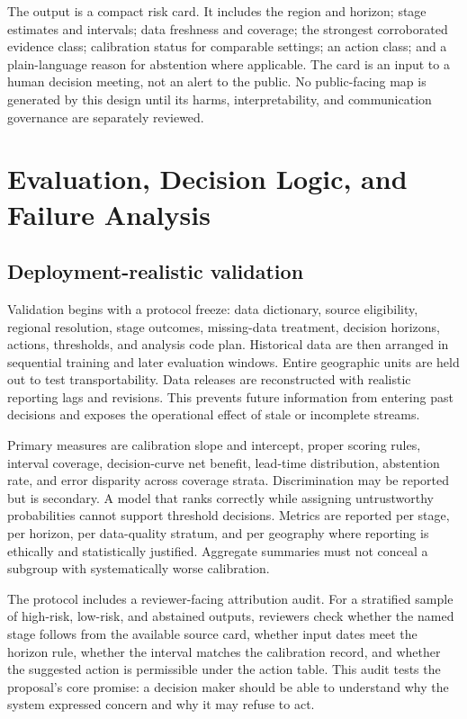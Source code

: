\documentclass[conference]{IEEEtran}
\begin{document}
The output is a compact risk card. It includes the region and horizon; stage estimates and intervals; data freshness and coverage; the strongest corroborated evidence class; calibration status for comparable settings; an action class; and a plain-language reason for abstention where applicable. The card is an input to a human decision meeting, not an alert to the public. No public-facing map is generated by this design until its harms, interpretability, and communication governance are separately reviewed.

\section{Evaluation, Decision Logic, and Failure Analysis}

\subsection{Deployment-realistic validation}

Validation begins with a protocol freeze: data dictionary, source eligibility, regional resolution, stage outcomes, missing-data treatment, decision horizons, actions, thresholds, and analysis code plan. Historical data are then arranged in sequential training and later evaluation windows. Entire geographic units are held out to test transportability. Data releases are reconstructed with realistic reporting lags and revisions. This prevents future information from entering past decisions and exposes the operational effect of stale or incomplete streams.

Primary measures are calibration slope and intercept, proper scoring rules, interval coverage, decision-curve net benefit, lead-time distribution, abstention rate, and error disparity across coverage strata. Discrimination may be reported but is secondary. A model that ranks correctly while assigning untrustworthy probabilities cannot support threshold decisions. Metrics are reported per stage, per horizon, per data-quality stratum, and per geography where reporting is ethically and statistically justified. Aggregate summaries must not conceal a subgroup with systematically worse calibration.

The protocol includes a reviewer-facing attribution audit. For a stratified sample of high-risk, low-risk, and abstained outputs, reviewers check whether the named stage follows from the available source card, whether input dates meet the horizon rule, whether the interval matches the calibration record, and whether the suggested action is permissible under the action table. This audit tests the proposal's core promise: a decision maker should be able to understand why the system expressed concern and why it may refuse to act.
\end{document}
